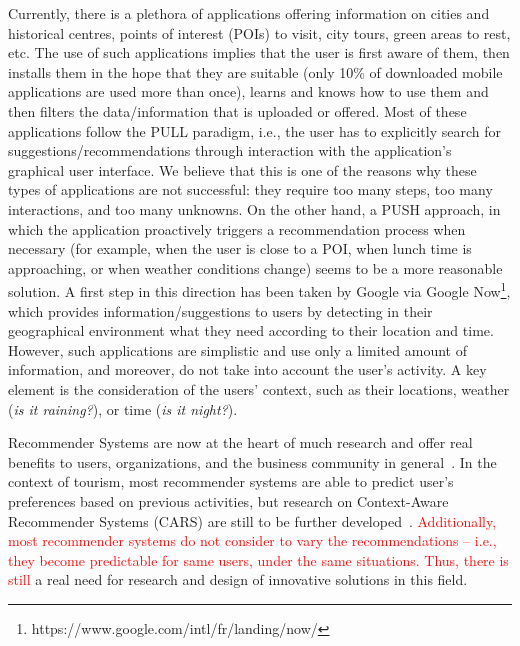 
Currently, there is a plethora of applications offering information on cities and historical centres, points of interest (POIs) to visit, city tours, green areas to rest, etc. The use of such applications implies that the user is first aware of them, then installs them in the hope that they are suitable (only 10\% of downloaded mobile applications are used more than once), learns and knows how
to use them and then filters the data/information that is uploaded or offered. Most of these
applications follow the PULL paradigm, i.e., the user has to explicitly search for
suggestions/recommendations through interaction with the application’s graphical user interface.
We believe that this is one of the reasons why these types of applications are not successful: they
require too many steps, too many interactions, and too many unknowns. On the other hand, a
PUSH approach, in which the application proactively triggers a recommendation process when
necessary (for example, when the user is close to a POI, when lunch time is approaching, or
when weather conditions change) seems to be a more reasonable solution. A first step in this
direction has been taken by Google via Google Now\footnote{https://www.google.com/intl/fr/landing/now/}, 
which provides information/suggestions
to users by detecting in their geographical environment what they need according to their
location and time. However, such applications are simplistic and use only a limited amount of
information, and moreover, do not take into account the user’s activity. A key element is the
consideration of the users' context, such as their locations, weather (\textit{is it raining?}), or time (\textit{is it night?}).

Recommender Systems are now at the heart of
much research and offer real benefits to users, organizations, and the business community in
general~\cite{borras2014intelligent,del2016pull,leskovec2020mining}. In the context of tourism, most recommender systems are able to predict user's preferences based on previous activities, but research on Context-Aware Recommender Systems
(CARS) are still to
be further developed~\cite{adomavicius2011context,nejma2015service,haruna2017context,raza2019progress}. \textcolor{red}{Additionally, most recommender systems do not consider to vary the recommendations -- i.e., they become predictable  for same users, under the same situations. Thus, there is still} a real need for research and design of innovative solutions in this field.



